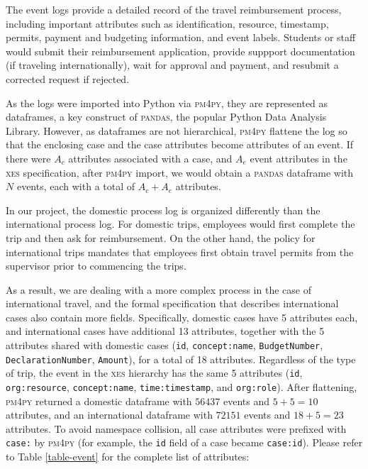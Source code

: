 \documentclass[conference]{IEEEtran}
\begin{document}
The event logs provide a detailed record of the travel reimbursement process,
including important attributes such as identification, resource,
timestamp, permits, payment and budgeting information, and event labels.
Students or staff would submit their reimbursement application,
provide suppport documentation (if traveling internationally), wait for
approval and payment, and resubmit a corrected request if rejected.

As the logs were imported into Python via \textsc{pm4py},
they are represented as
dataframes, a key construct of
\textsc{pandas}, the popular Python Data Analysis Library. However, as
dataframes are not hierarchical, \textsc{pm4py} flattene the log so that 
the enclosing case and the case attributes
become attributes of an event. If
there were $A_c$ attributes associated with a
case, and $A_e$ event attributes in the
\textsc{xes} specification, after \textsc{pm4py} import, we would obtain a
\textsc{pandas} dataframe 
with $N$ events, each with a total of $A_c + A_e$ attributes.

In our project,
the domestic process log is organized differently than
the international process log.  For domestic trips, employees would first
complete the trip and then ask for reimbursement. On the other hand,
the policy for international trips mandates that
employees first obtain travel permits from the supervisor prior to
commencing the trips.

As a result, we are dealing with a more complex process in the case of
international travel, and the formal specification that describes
international cases also contain more fields.
Specifically, domestic cases have 5 attributes
each, and international cases have additional 13 attributes, together
with the 5 attributes shared with domestic cases
(\texttt{id}, \texttt{concept:name}, \texttt{BudgetNumber},
\texttt{DeclarationNumber}, \texttt{Amount}), for a total of 18 attributes.
Regardless of the type of trip,
the event in the \textsc{xes} hierarchy has the same 5 attributes
(\texttt{id}, \texttt{org:resource}, \texttt{concept:name},
\texttt{time:timestamp}, and \texttt{org:role}).
After flattening, \textsc{pm4py} returned a
domestic dataframe with $56437$ events and $5+5=10$ attributes, and
an international dataframe with $72151$ events and $18+5=23$ attributes.
To avoid namespace collision, all case attributes were prefixed with
\texttt{case:} by \textsc{pm4py} (for example, the \texttt{id} field of a case
became \texttt{case:id}). Please refer to Table
\ref{table-event} for the complete list of attributes:
\end{document}

